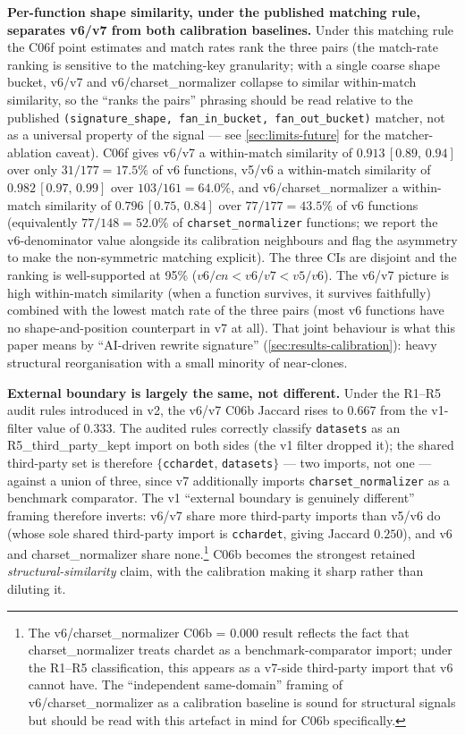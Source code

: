 \documentclass[11pt,letterpaper]{article}
\begin{document}
\textbf{Per-function shape similarity, under the published
matching rule, separates v6/v7 from both calibration baselines.}
Under this matching rule the C06f point estimates and match rates
rank the three pairs (the match-rate ranking is sensitive to the
matching-key granularity; with a single coarse shape bucket,
v6/v7 and v6/charset\_normalizer collapse to similar within-match
similarity, so the ``ranks the pairs'' phrasing should be read
relative to the published \texttt{(signature\_shape, fan\_in\_bucket,
fan\_out\_bucket)} matcher, not as a universal property of the
signal --- see \cref{sec:limits-future} for the matcher-ablation
caveat). C06f gives
v6/v7 a within-match similarity of $0.913\,[0.89,\,0.94]$ over
only $31/177=17.5\%$ of v6 functions, v5/v6 a within-match
similarity of $0.982\,[0.97,\,0.99]$ over $103/161=64.0\%$, and
v6/charset\_normalizer a within-match similarity of
$0.796\,[0.75,\,0.84]$ over $77/177=43.5\%$ of v6 functions
(equivalently $77/148=52.0\%$ of \texttt{charset\_normalizer}
functions; we report the v6-denominator value alongside its
calibration neighbours and flag the asymmetry to make the
non-symmetric matching explicit). The three CIs are
disjoint and the ranking is well-supported at 95\%
($v6/cn < v6/v7 < v5/v6$). The v6/v7 picture is high
within-match similarity (when a function survives, it survives
faithfully) combined with the lowest match rate of the three
pairs (most v6 functions have no shape-and-position counterpart
in v7 at all). That joint behaviour is what this paper means by
``AI-driven rewrite signature'' (\cref{sec:results-calibration}):
heavy structural reorganisation with a small minority of near-clones.

\textbf{External boundary is largely the same, not different.}
Under the R1--R5 audit rules introduced in v2, the v6/v7 C06b
Jaccard rises to $0.667$ from the v1-filter value of $0.333$.
The audited rules correctly classify \texttt{datasets} as an
R5\_third\_party\_kept import on both sides (the v1 filter dropped
it); the shared third-party set is therefore
$\{$\texttt{cchardet}, \texttt{datasets}$\}$ --- two imports, not
one --- against a union of three, since v7 additionally imports
\texttt{charset\_normalizer} as a benchmark comparator. The v1
``external boundary is genuinely different''
framing therefore inverts: v6/v7 share more third-party imports
than v5/v6 do (whose sole shared third-party import is
\texttt{cchardet}, giving Jaccard $0.250$), and v6 and
charset\_normalizer share none.\footnote{The
v6/charset\_normalizer C06b = $0.000$ result reflects the fact that
charset\_normalizer treats chardet as a benchmark-comparator import;
under the R1--R5 classification, this appears as a v7-side
third-party import that v6 cannot have. The ``independent
same-domain'' framing of v6/charset\_normalizer as a calibration
baseline is sound for structural signals but should be read with
this artefact in mind for C06b specifically.} C06b
becomes the strongest retained \emph{structural-similarity}
claim, with the calibration making it sharp rather than diluting
it.
\end{document}

